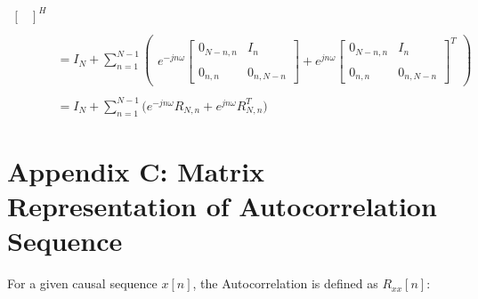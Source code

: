 \documentclass{article}
\begin{document}
\begin{align*}
\begin{bmatrix}
                                      \end{bmatrix}^{H} \\ \\
    &= I_{N} + \sum_{n = 1}^{N - 1}\begin{pmatrix}
                                        e^{-jn\omega}\begin{bmatrix}
                                                            0_{N - n, n} & I_{n} \\ \\
                                                            0_{    n, n} & 0_{n, N - n}
                                                       \end{bmatrix} +
                                        e^{ jn\omega}\begin{bmatrix}
                                                            0_{N - n, n} & I_{n} \\ \\
                                                            0_{    n, n} & 0_{n, N - n}
                                                       \end{bmatrix}^{T}
                                     \end{pmatrix} \\ \\
    &= I_{N} + \sum_{n = 1}^{N - 1}\bigg( e^{-jn\omega}R_{N, n} + e^{ jn\omega}R_{N, n}^{T} \bigg)
  \end{align*}

\newpage
\section*{Appendix C: Matrix Representation of Autocorrelation Sequence}

For a given causal sequence $x[n]$, the Autocorrelation is defined as $R_{xx}[n]$:
\end{document}
